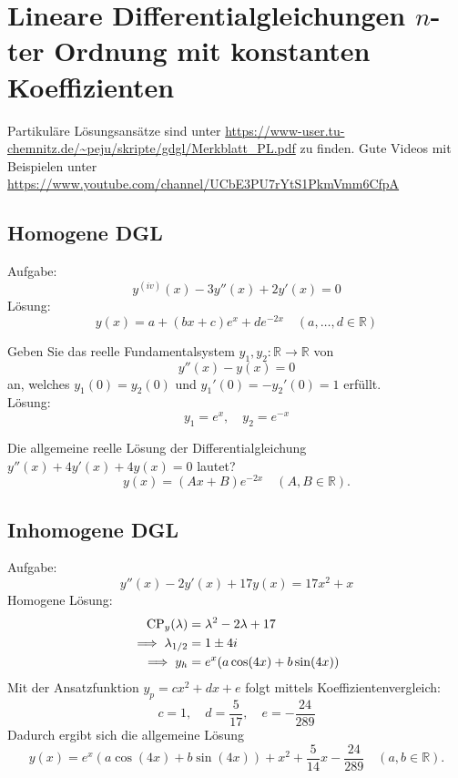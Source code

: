 \section{Lineare Differentialgleichungen $n$-ter Ordnung mit konstanten Koeffizienten}
Partikuläre Lösungsansätze sind unter \url{https://www-user.tu-chemnitz.de/~peju/skripte/gdgl/Merkblatt_PL.pdf} zu finden.
Gute Videos mit Beispielen unter \url{https://www.youtube.com/channel/UCbE3PU7rYtS1PkmVmm6CfpA}

\subsection{Homogene DGL}
Aufgabe:
\begin{displaymath}
  y^{(iv)}(x) - 3y''(x) + 2y'(x) = 0
\end{displaymath}
Lösung:
\begin{displaymath}
  y(x) = a + (bx + c)e^x + de^{-2x} \quad (a, \dots, d \in \mathbb{R})
\end{displaymath}

Geben Sie das reelle Fundamentalsystem $y_1, y_2 : \mathbb{R} \to \mathbb{R}$ von
\begin{displaymath}
  y''(x) - y(x) = 0
\end{displaymath}
an, welches $y_1(0) = y_2(0)$ und $y_1'(0) = -y_2'(0) = 1$ erfüllt.\\
Lösung:
\begin{displaymath}
  y_1 = e^x, \quad y_2 = e^{-x}
\end{displaymath}

Die allgemeine reelle Lösung der Differentialgleichung $y''(x) + 4y'(x) + 4y(x) = 0$ lautet?
\begin{displaymath}
  y(x) = (Ax + B) e^{-2x} \quad (A,B \in \mathbb{R}).
\end{displaymath}

\subsection{Inhomogene DGL}
Aufgabe:
\begin{displaymath}
  y''(x) - 2y'(x) + 17y(x) = 17x^2 + x
\end{displaymath}
Homogene Lösung:
\begin{align*}
  \operatorname{CP}_y(\lambda) &= \lambda^2 - 2\lambda + 17\\
  \implies \lambda_{1/2} &= 1 \pm 4i\\
  \implies y_h &= e^x(a \cos(4x) + b \sin(4x))
\end{align*}
Mit der Ansatzfunktion $y_p = cx^2 + dx + e$ folgt mittels Koeffizientenvergleich:
\begin{displaymath}
  c = 1, \quad d = \frac{5}{17}, \quad e = -\frac{24}{289}
\end{displaymath}
Dadurch ergibt sich die allgemeine Lösung
\begin{displaymath}
  y(x) = e^x(a \cos(4x) + b \sin(4x)) + x^2 + \frac{5}{14}x - \frac{24}{289} \quad (a,b \in \mathbb{R}).
\end{displaymath}

